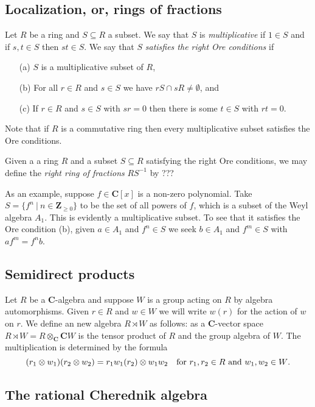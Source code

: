 \documentclass[12pt, reqno]{amsart}
\numberwithin{equation}{section}
\theoremstyle{definition}
\theoremstyle{plain}
\newcommand{\CC}{\mathbf{C}}
\newcommand{\ZZ}{\mathbf{Z}}
\begin{document}
\subsection{Localization, or, rings of fractions} Let $R$ be a ring and $S \subseteq R$ a subset. We say that $S$ is \emph{multiplicative} if $1 \in S$ and if $s,t \in S$ then $st \in S$. We say that $S$ \emph{satisfies the right Ore conditions} if 
\begin{itemize}
\item[(a)] $S$ is a multiplicative subset of $R$,

\item[(b)] For all $r \in R$ and $s \in S$ we have $rS \cap s R \neq \emptyset$, and

\item[(c)] If $r \in R$ and $s \in S$ with $sr=0$ then there is some $t \in S$ with $rt=0$.
\end{itemize}
Note that if $R$ is a commutative ring then every multiplicative subset satisfies the Ore conditions. 

Given a a ring $R$ and a subset $S \subseteq R$ satisfying the right Ore conditions, we may define the \emph{right ring of fractions} $RS^{-1}$ by ???

As an example, suppose $f \in \CC[x]$ is a non-zero polynomial. Take $S=\{f^n \ | \ n \in \ZZ_{\geq 0} \}$ to be the set of all powers of $f$, which is a subset of the Weyl algebra $A_1$. This is evidently a multiplicative subset. To see that it satisfies the Ore condition (b), given $a \in A_1$ and $f^n \in S$ we seek $b \in A_1$ and $f^m \in S$ with $af^m=f^nb$.

\subsection{Semidirect products} Let $R$ be a $\CC$-algebra and suppose $W$ is a group acting on $R$ by algebra automorphisms. Given $r \in R$ and $w \in W$ we will write $w(r)$ for the action of $w$ on $r$. We define an new algebra $R \rtimes W$ as follows: as a $\CC$-vector space $R \rtimes W=R \otimes_\CC \CC W$ is the tensor product of $R$ and the group algebra of $W$. The multiplication is determined by the formula
$$(r_1 \otimes w_1)(r_2 \otimes w_2)=r_1 w_1(r_2) \otimes w_1 w_2 \quad \hbox{for $r_1,r_2 \in R$ and $w_1, w_2 \in W$.}$$ 

\subsection{The rational Cherednik algebra}
\end{document}
